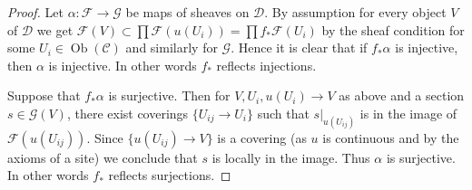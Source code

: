 \documentclass[10pt,a4paper]{amsart}
\theoremstyle{plain}
\theoremstyle{definition}
\theoremstyle{remark}
\numberwithin{equation}{subsection}
\def\Ob{\mathop{\mathrm{Ob}}\nolimits}
\begin{document}
\begin{proof}
Let $\alpha : \mathcal{F} \to \mathcal{G}$ be maps of sheaves
on $\mathcal{D}$. By assumption for every object $V$ of $\mathcal{D}$
we get $\mathcal{F}(V) \subset \prod \mathcal{F}(u(U_i)) =
\prod f_*\mathcal{F}(U_i)$ by the sheaf condition
for some $U_i \in \Ob(\mathcal{C})$ and similarly for $\mathcal{G}$.
Hence it is clear that if $f_*\alpha$ is injective, then
$\alpha$ is injective. In other words $f_*$ reflects injections.

\medskip\noindent
Suppose that $f_*\alpha$ is surjective. Then for $V, U_i, u(U_i) \to V$
as above and a section $s \in \mathcal{G}(V)$, there exist coverings
$\{U_{ij} \to U_i\}$ such that $s|_{u(U_{ij})}$ is in the image
of $\mathcal{F}(u(U_{ij}))$. Since $\{u(U_{ij}) \to V\}$ is a covering
(as $u$ is continuous and by the axioms of a site) we conclude that
$s$ is locally in the image. Thus $\alpha$ is surjective. In other
words $f_*$ reflects surjections.
\end{proof}
\end{document}
